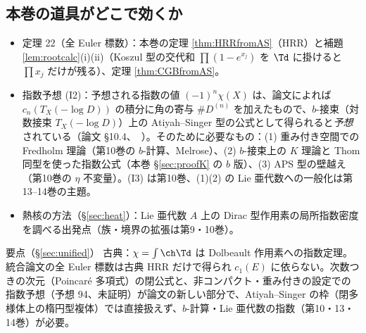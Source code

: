 \subsection{本巻の道具がどこで効くか}
\begin{itemize}
\item 定理 22（全 Euler 標数）：本巻の定理 \ref{thm:HRRfromAS}（HRR）と補題 \ref{lem:rootcalc}(i)(ii)（Koszul 型の交代和 $\prod(1-e^{x_j})$ を $\Td$ に掛けると $\prod x_j$ だけが残る）、定理 \ref{thm:CGBfromAS}。
\item 指数予想 (I2)：予想される指数の値 $(-1)^n\chi(X)$ は、論文によれば $c_n(T_X(-\log D))$ の積分に角の寄与 $\#D^{(n)}$ を加えたもので、$b$-接束（対数接束 $T_X(-\log D)$）上の Atiyah--Singer 型の公式として得られると\emph{予想}されている（論文 \S10.4、\tQ\ ）。そのために必要なもの：(1) 重み付き空間での Fredholm 理論（第10巻の $b$-計算、Melrose）、(2) $b$-接束上の $K$ 理論と Thom 同型を使った指数公式（本巻 \S\ref{sec:proofK} の $b$ 版）、(3) APS 型の壁越え（第10巻の $\eta$ 不変量）。(I3) は第10巻、(1)(2) の Lie 亜代数への一般化は第13--14巻の主題。
\item 熱核の方法（\S\ref{sec:heat}）：Lie 亜代数 $A$ 上の Dirac 型作用素の局所指数密度を調べる出発点（族・境界の拡張は第9・10巻）。
\end{itemize}
\begin{keybox}{要点（\S\ref{sec:unified}）}
古典：$\chi=\int\ch\Td$ は Dolbeault 作用素への指数定理。統合論文の全 Euler 標数は古典 HRR だけで得られ $c_1(E)$ に依らない。次数つきの次元（Poincaré 多項式）の閉公式と、非コンパクト・重み付きの設定での指数予想（予想 94、未証明）が論文の新しい部分で、Atiyah--Singer の枠（閉多様体上の楕円型複体）では直接扱えず、$b$-計算・Lie 亜代数の指数（第10・13・14巻）が必要。
\end{keybox}

